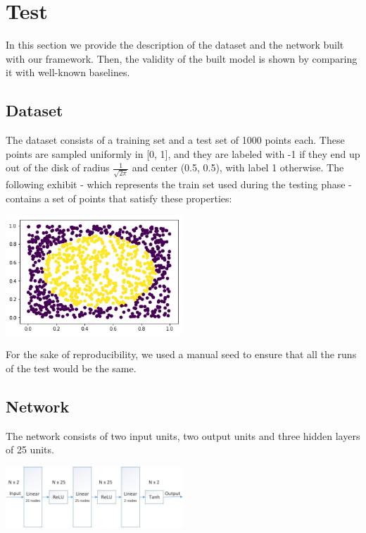 \documentclass[10pt,conference,compsocconf]{IEEEtran}
\begin{document}
\section{Test}
In this section we provide the description of the dataset and the network built with our framework. Then, the validity of the built model is shown by comparing it with well-known baselines.

\subsection{Dataset}
The dataset consists of a training set and a test set of 1000 points each. These points are sampled uniformly in [0, 1], and they are labeled with -1 if they end up out of the disk of radius \( \frac{1}{\sqrt{2\pi}} \) and center (0.5, 0.5), with label 1 otherwise. The following exhibit - which represents the train set used during the testing phase - contains a set of points that satisfy these properties:

\begin{center}
	\captionsetup{type=figure}
	\includegraphics[width=0.5\textwidth]{img/dataset.png}
	\label{fig:dataset}
\end{center} 

For the sake of reproducibility, we used a manual seed to ensure that all the runs of the test would be the same.

\subsection{Network}
The network consists of two input units, two output units and three hidden layers of 25 units.

\begin{center}
	\captionsetup{type=figure}
	\includegraphics[width=0.5\textwidth]{img/Network.jpg}
	\label{fig:network}
\end{center} 
\end{document}
